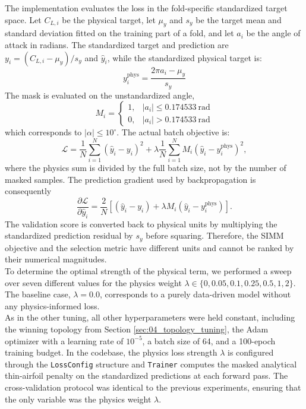 The implementation evaluates the loss in the fold-specific standardized target space. Let $C_{L,i}$ be the physical target, let $\mu_y$ and $s_y$ be the target mean and standard deviation fitted on the training part of a fold, and let $a_i$ be the angle of attack in radians. The standardized target and prediction are $y_i=(C_{L,i}-\mu_y)/s_y$ and $\hat{y}_i$, while the standardized physical target is:
\begin{equation}
    y_i^{\mathrm{phys}}=\frac{2\pi a_i-\mu_y}{s_y}
    \label{eq:04_physics_target}
\end{equation}
The mask is evaluated on the unstandardized angle,
\begin{equation}
    M_i=\begin{cases}
        1, & |a_i|\leq 0.174533\ \mathrm{rad}\\
        0, & |a_i|>0.174533\ \mathrm{rad}
    \end{cases}
    \label{eq:04_physics_mask}
\end{equation}
which corresponds to $|\alpha|\leq10^\circ$. The actual batch objective is:
\begin{equation}
    \mathcal{L}=\frac{1}{N}\sum_{i=1}^{N}(\widehat{y}_i-y_i)^2
    +\lambda\frac{1}{N}\sum_{i=1}^{N}M_i
    (\widehat{y}_i-y_i^{\mathrm{phys}})^2,
    \label{eq:04_simm_loss}
\end{equation}
where the physics sum is divided by the full batch size, not by the number of masked samples. The prediction gradient used by backpropagation is consequently
\begin{equation}
    \frac{\partial\mathcal{L}}{\partial\widehat{y}_i}
    =\frac{2}{N}\left[(\widehat{y}_i-y_i)
    +\lambda M_i(\widehat{y}_i-y_i^{\mathrm{phys}})\right].
    \label{eq:04_physics_gradient}
\end{equation}
The validation score is converted back to physical units by multiplying the standardized prediction residual by $s_y$ before squaring. Therefore, the SIMM objective and the selection metric have different units and cannot be ranked by their numerical magnitudes.\\

To determine the optimal strength of the physical term, we performed a sweep over seven different values for the physics weight $\lambda\in\{0,0.05,0.1,0.25,0.5,1,2\}$. The baseline case, $\lambda=0.0$, corresponds to a purely data-driven model without any physics-informed loss.\\

As in the other tuning, all other hyperparameters were held constant, including the winning topology from Section \ref{sec:04_topology_tuning}, the Adam optimizer with a learning rate of $10^{-5}$, a batch size of 64, and a 100-epoch training budget. In the codebase, the physics loss strength $\lambda$ is configured through the \texttt{LossConfig} structure and \texttt{Trainer} computes the masked analytical thin-airfoil penalty on the standardized predictions at each forward pass. The cross-validation protocol was identical to the previous experiments, ensuring that the only variable was the physics weight $\lambda$.\\

